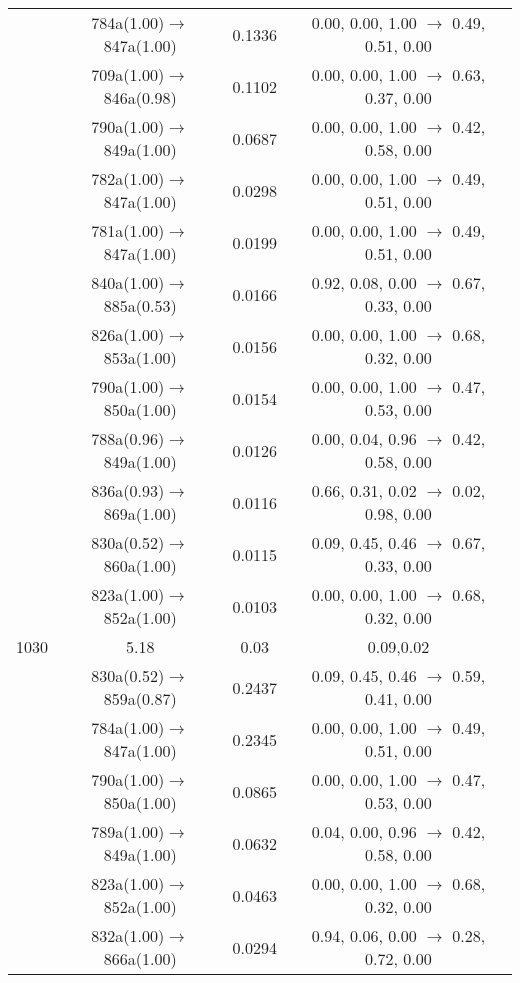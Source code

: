 \documentclass[10pt,a4paper]{article}
\begin{document}
\begin{longtable}{c|c|c|c}
 	& 784a(1.00)$\rightarrow$847a(1.00) &	 0.1336 &	 0.00, 0.00, 1.00 $\rightarrow$ 0.49, 0.51, 0.00 \\ 
 	& 709a(1.00)$\rightarrow$846a(0.98) &	 0.1102 &	 0.00, 0.00, 1.00 $\rightarrow$ 0.63, 0.37, 0.00 \\ 
 	& 790a(1.00)$\rightarrow$849a(1.00) &	 0.0687 &	 0.00, 0.00, 1.00 $\rightarrow$ 0.42, 0.58, 0.00 \\ 
 	& 782a(1.00)$\rightarrow$847a(1.00) &	 0.0298 &	 0.00, 0.00, 1.00 $\rightarrow$ 0.49, 0.51, 0.00 \\ 
 	& 781a(1.00)$\rightarrow$847a(1.00) &	 0.0199 &	 0.00, 0.00, 1.00 $\rightarrow$ 0.49, 0.51, 0.00 \\ 
 	& 840a(1.00)$\rightarrow$885a(0.53) &	 0.0166 &	 0.92, 0.08, 0.00 $\rightarrow$ 0.67, 0.33, 0.00 \\ 
 	& 826a(1.00)$\rightarrow$853a(1.00) &	 0.0156 &	 0.00, 0.00, 1.00 $\rightarrow$ 0.68, 0.32, 0.00 \\ 
 	& 790a(1.00)$\rightarrow$850a(1.00) &	 0.0154 &	 0.00, 0.00, 1.00 $\rightarrow$ 0.47, 0.53, 0.00 \\ 
 	& 788a(0.96)$\rightarrow$849a(1.00) &	 0.0126 &	 0.00, 0.04, 0.96 $\rightarrow$ 0.42, 0.58, 0.00 \\ 
 	& 836a(0.93)$\rightarrow$869a(1.00) &	 0.0116 &	 0.66, 0.31, 0.02 $\rightarrow$ 0.02, 0.98, 0.00 \\ 
 	& 830a(0.52)$\rightarrow$860a(1.00) &	 0.0115 &	 0.09, 0.45, 0.46 $\rightarrow$ 0.67, 0.33, 0.00 \\ 
 	& 823a(1.00)$\rightarrow$852a(1.00) &	 0.0103 &	 0.00, 0.00, 1.00 $\rightarrow$ 0.68, 0.32, 0.00 \\ 
 \hline1030 &	 5.18 &	 0.03 &	 0.09,0.02 \\ 
  	& 830a(0.52)$\rightarrow$859a(0.87) &	 0.2437 &	 0.09, 0.45, 0.46 $\rightarrow$ 0.59, 0.41, 0.00 \\ 
 	& 784a(1.00)$\rightarrow$847a(1.00) &	 0.2345 &	 0.00, 0.00, 1.00 $\rightarrow$ 0.49, 0.51, 0.00 \\ 
 	& 790a(1.00)$\rightarrow$850a(1.00) &	 0.0865 &	 0.00, 0.00, 1.00 $\rightarrow$ 0.47, 0.53, 0.00 \\ 
 	& 789a(1.00)$\rightarrow$849a(1.00) &	 0.0632 &	 0.04, 0.00, 0.96 $\rightarrow$ 0.42, 0.58, 0.00 \\ 
 	& 823a(1.00)$\rightarrow$852a(1.00) &	 0.0463 &	 0.00, 0.00, 1.00 $\rightarrow$ 0.68, 0.32, 0.00 \\ 
 	& 832a(1.00)$\rightarrow$866a(1.00) &	 0.0294 &	 0.94, 0.06, 0.00 $\rightarrow$ 0.28, 0.72, 0.00 \\ 

\end{longtable}
\end{document}
